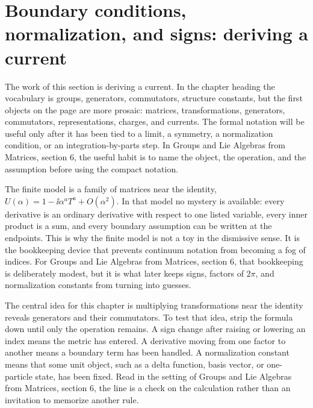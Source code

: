 \section{Boundary conditions, normalization, and signs: deriving a current}













The work of this section is deriving a current.  In the chapter heading the vocabulary is groups, generators, commutators, structure constants, but the first objects on the page are more prosaic: matrices, transformations, generators, commutators, representations, charges, and currents.  The formal notation will be useful only after it has been tied to a limit, a symmetry, a normalization condition, or an integration-by-parts step.  In Groups and Lie Algebras from Matrices, section 6, the useful habit is to name the object, the operation, and the assumption before using the compact notation.

The finite model is a family of matrices near the identity, \(U(\alpha)=1-\ii\alpha^aT^a+O(\alpha^2)\).  In that model no mystery is available: every derivative is an ordinary derivative with respect to one listed variable, every inner product is a sum, and every boundary assumption can be written at the endpoints.  This is why the finite model is not a toy in the dismissive sense.  It is the bookkeeping device that prevents continuum notation from becoming a fog of indices.  For Groups and Lie Algebras from Matrices, section 6, that bookkeeping is deliberately modest, but it is what later keeps signs, factors of \(2\pi\), and normalization constants from turning into guesses.

The central idea for this chapter is multiplying transformations near the identity reveals generators and their commutators.  To test that idea, strip the formula down until only the operation remains.  A sign change after raising or lowering an index means the metric has entered.  A derivative moving from one factor to another means a boundary term has been handled.  A normalization constant means that some unit object, such as a delta function, basis vector, or one-particle state, has been fixed.  Read in the setting of Groups and Lie Algebras from Matrices, section 6, the line is a check on the calculation rather than an invitation to memorize another rule.

